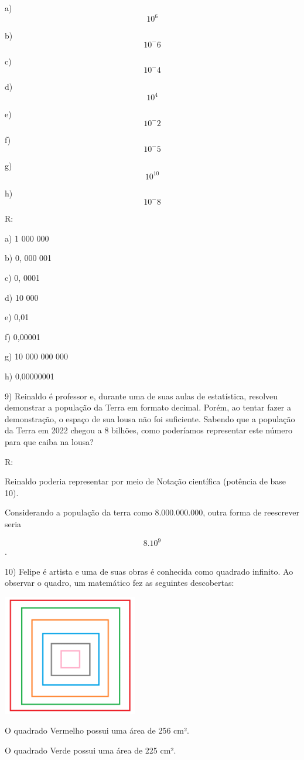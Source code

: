 a) \[10^6\]

b) \[10^-6\]

c) \[10^-4\]

d) \[10^4\]

e) \[10^-2\]

f) \[10 ^-5\]

g) \[10^10\]

h) \[10^-8\]

R:

a) 1 000 000

b) 0, 000 001

c) 0, 0001

d) 10 000

e) 0,01

f) 0,00001

g) 10 000 000 000

h) 0,00000001

9) Reinaldo é professor e, durante uma de suas aulas de estatística,
resolveu demonstrar a população da Terra em formato decimal. Porém, ao
tentar fazer a demonstração, o espaço de sua lousa não foi suficiente.
Sabendo que a população da Terra em 2022 chegou a 8 bilhões, como
poderíamos representar este número para que caiba na lousa?

R:

Reinaldo poderia representar por meio de Notação científica (potência de
base 10).

Considerando a população da terra como 8.000.000.000, outra forma de
reescrever seria

\[8 . 10^9\].

10) Felipe é artista e uma de suas obras é conhecida como quadrado
infinito. Ao observar o quadro, um matemático fez as seguintes
descobertas:

\includegraphics[width=2.3125in,height=2.07917in]{./imgSAEB_8_MAT/media/image2.png}

O quadrado Vermelho possui uma área de 256 cm².

O quadrado Verde possui uma área de 225 cm².

